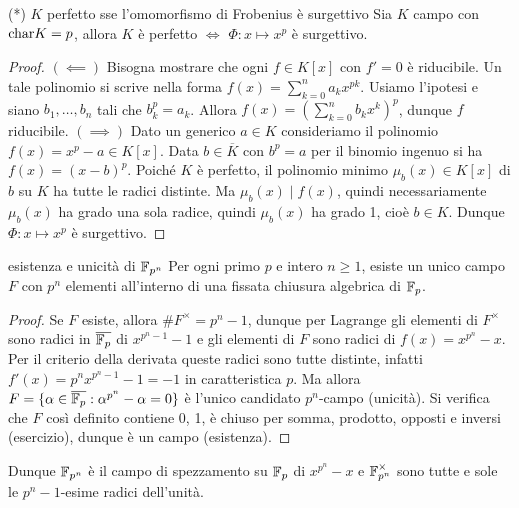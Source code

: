 \begin{theorem}{(*) $K$ perfetto sse l'omomorfismo di Frobenius è surgettivo}
    Sia $K$ campo con $\text{char} K = p$, allora $K$ è perfetto $\iff$ $\Phi: x \mapsto x^p$ è surgettivo.
\end{theorem}
\begin{proof}
    $(\impliedby)$ Bisogna mostrare che ogni $f \in K[x]$ con $f' = 0$ è riducibile. Un tale polinomio si scrive nella forma $f(x) = \sum_{k=0}^{n} a_k x^{pk}$. Usiamo l'ipotesi e siano $b_1, \dots, b_n$ tali che $b_k^p = a_k$. Allora $f(x) = (\sum_{k=0}^{n} b_k x^{k})^p$, dunque $f$ riducibile.
    $(\implies)$ Dato un generico $a \in K$ consideriamo il polinomio $f(x) = x^p - a \in K[x]$. Data $b \in \overline{K}$ con $b^p = a$ per il binomio ingenuo si ha $f(x) = (x - b)^p$. Poiché $K$ è perfetto, il polinomio minimo $\mu_b(x) \in K[x]$ di $b$ su $K$ ha tutte le radici distinte. Ma $\mu_b(x) \mid f(x)$, quindi necessariamente $\mu_b(x)$ ha grado una sola radice, quindi $\mu_b(x)$ ha grado 1, cioè $b \in K$. Dunque $\Phi : x \mapsto x^p$ è surgettivo.
\end{proof}

\begin{theorem}{esistenza e unicità di $\mathbb{F}_{p^n}$}
    Per ogni primo $p$ e intero $n \ge 1$, esiste un unico campo $F$ con $p^n$ elementi all'interno di una fissata chiusura algebrica di $\mathbb{F}_p$.
\end{theorem}
\begin{proof}
    Se $F$ esiste, allora $\#F^\times = p^n - 1$, dunque per Lagrange gli elementi di $F^\times$ sono radici in $\overline{\mathbb{F}_p}$ di $x^{p^n - 1} - 1$ e gli elementi di $F$ sono radici di $f(x) = x^{p^n} - x$. Per il criterio della derivata queste radici sono tutte distinte, infatti $f'(x) = p^n x^{p^n - 1} - 1 = -1$ in caratteristica $p$. Ma allora $F = \{ \alpha \in \overline{\mathbb{F}_p} : \alpha^{p^n} - \alpha = 0 \}$ è l'unico candidato $p^n$-campo (unicità). Si verifica che $F$ così definito contiene 0, 1, è chiuso per somma, prodotto, opposti e inversi (esercizio), dunque è un campo (esistenza).
\end{proof}

Dunque $\mathbb{F}_{p^n}$ è il campo di spezzamento su $\mathbb{F}_p$ di $x^{p^n} - x$ e $\mathbb{F}_{p^n}^\times$ sono tutte e sole le $p^n-1$-esime radici dell'unità.

